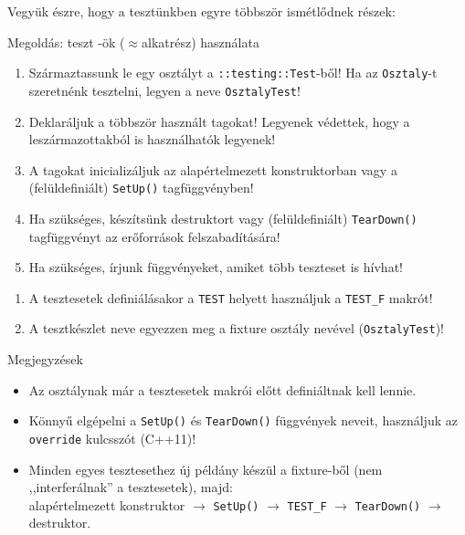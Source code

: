 \begin{frame}
  Vegyük észre, hogy a tesztünkben egyre többször ismétlődnek részek:
  \begin{exampleblock}{}
    \tiny
    
    
    
  \end{exampleblock}
\end{frame}


\begin{frame}
  Megoldás: teszt -ök ($\approx$alkatrész) használata
  \begin{enumerate}
    \item Származtassunk le egy osztályt a \texttt{::testing::Test}-ből! Ha az \texttt{Osztaly}-t szeretnénk tesztelni, legyen 
a neve \texttt{OsztalyTest}!
    \item Deklaráljuk a többször használt tagokat! Legyenek védettek, hogy a leszármazottakból is használhatók legyenek!
    \item A tagokat inicializáljuk az alapértelmezett konstruktorban vagy a (felüldefiniált) \texttt{SetUp()} tagfüggvényben!
    \item Ha szükséges, készítsünk destruktort vagy (felüldefiniált) \texttt{TearDown()} tagfüggvényt az 
erőforrások felszabadítására!
    \item Ha szükséges, írjunk függvényeket, amiket több teszteset is hívhat!
    \setcounter{fixtures}{\theenumi}
  \end{enumerate}
\end{frame}

\begin{frame}
  \begin{enumerate}
    \setcounter{enumi}{\thefixtures}
    \item A tesztesetek definiálásakor a \texttt{TEST} helyett használjuk a \texttt{TEST\_F} makrót!
    \item A tesztkészlet neve egyezzen meg a fixture osztály nevével (\texttt{OsztalyTest})!
  \end{enumerate}
  \vfill
  Megjegyzések
  \begin{itemize}
    \item Az osztálynak már a tesztesetek makrói előtt definiáltnak kell lennie.
    \item Könnyű elgépelni a \texttt{SetUp()} és \texttt{TearDown()} függvények neveit, használjuk az \texttt{override} 
kulcsszót (C++11)!
    \item Minden egyes tesztesethez új példány készül a fixture-ből (nem ,,interferálnak'' a tesztesetek), majd:\\ 
alapértelmezett konstruktor $\to$ \texttt{SetUp()} $\to$ \texttt{TEST\_F} $\to$ \texttt{TearDown()} $\to$ destruktor.
  \end{itemize}
\end{frame}

